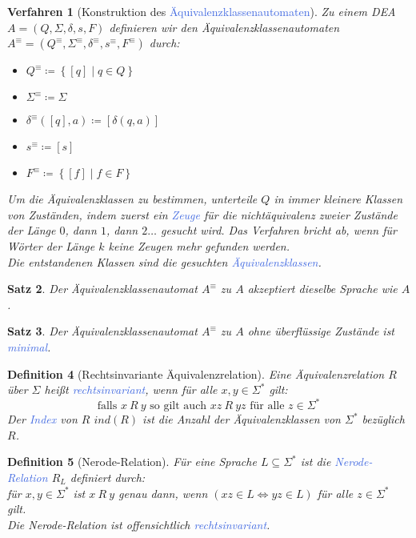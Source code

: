 \documentclass[11pt]{scrartcl}
\newcommand{\tcol}[1]{\textcolor{RoyalBlue}{#1}}
\newcommand{\set}[1]{\left\lbrace #1\right\rbrace}
\theoremstyle{break}
\newtheorem{satz}{Satz}[section]
\newtheorem{defi}[satz]{Definition}
\newtheorem{verf}[satz]{Verfahren}
\begin{document}
    \begin{verf}[Konstruktion des \tcol{Äquivalenzklassenautomaten}]
        Zu einem DEA $A=(Q,\Sigma,\delta ,s,F)$ definieren wir den Äquivalenzklassenautomaten $A^\equiv=(Q^\equiv ,\Sigma^\equiv ,\delta^\equiv ,s^\equiv ,F^\equiv)$ durch:
        \begin{itemize}
            \item $Q^\equiv\coloneqq\set{[q]\mid q\in Q}$
            \item $\Sigma^\equiv\coloneqq\Sigma$
            \item $\delta^\equiv([q],a)\coloneqq[\delta(q,a)]$
            \item $s^\equiv\coloneqq[s]$
            \item $F^\equiv\coloneqq\set{[f]\mid f\in F}$
        \end{itemize}
        Um die Äquivalenzklassen zu bestimmen, unterteile $Q$ in immer kleinere Klassen von Zuständen, indem zuerst ein \tcol{Zeuge} für die nichtäquivalenz zweier Zustände der Länge $0$, dann $1$, dann $2\dots$ gesucht wird.
        Das Verfahren bricht ab, wenn für Wörter der Länge $k$ keine Zeugen mehr gefunden werden.\\
        Die entstandenen Klassen sind die gesuchten \tcol{Äquivalenzklassen}.
    \end{verf}

    \begin{satz}
        Der Äquivalenzklassenautomat $A^\equiv$ zu $A$ akzeptiert dieselbe Sprache wie $A$.
    \end{satz}

    \begin{satz}
        Der Äquivalenzklassenautomat $A^\equiv$ zu $A$ ohne überflüssige Zustände ist \tcol{minimal}.
    \end{satz}

    \begin{defi}[Rechtsinvariante Äquivalenzrelation]
        Eine Äquivalenzrelation $R$ über $\Sigma$ heißt \tcol{rechtsinvariant}, wenn für alle $x,y\in\Sigma^*$ gilt:
        \[\text{falls } x\ R\ y\text{ so gilt auch }xz\ R\ yz\text{ für alle } z\in\Sigma^*\]
        Der \tcol{Index} von $R$ $ind(R)$ ist die Anzahl der Äquivalenzklassen von $\Sigma^*$ bezüglich $R$.
    \end{defi}

    \begin{defi}[Nerode-Relation]
        Für eine Sprache $L\subseteq\Sigma^*$ ist die \tcol{Nerode-Relation} $R_L$ definiert durch:\\
        für $x,y\in\Sigma^*$ ist $x\ R\ y$ genau dann, wenn $(xz\in L\Leftrightarrow yz\in L)$ für alle $z\in\Sigma^*$ gilt.\\
        Die Nerode-Relation ist offensichtlich \tcol{rechtsinvariant}.
    \end{defi}
\end{document}
